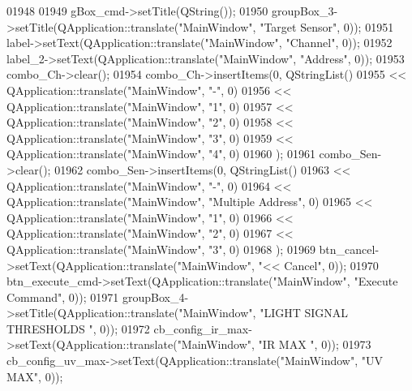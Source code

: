 \begin{DoxyCode}
01948 
01949         gBox\_cmd->setTitle(QString());
01950         groupBox\_3->setTitle(QApplication::translate(\textcolor{stringliteral}{"MainWindow"}, \textcolor{stringliteral}{"Target Sensor"}, 0));
01951         label->setText(QApplication::translate(\textcolor{stringliteral}{"MainWindow"}, \textcolor{stringliteral}{"Channel"}, 0));
01952         label\_2->setText(QApplication::translate(\textcolor{stringliteral}{"MainWindow"}, \textcolor{stringliteral}{"Address"}, 0));
01953         combo\_Ch->clear();
01954         combo\_Ch->insertItems(0, QStringList()
01955          << QApplication::translate(\textcolor{stringliteral}{"MainWindow"}, \textcolor{stringliteral}{"-"}, 0)
01956          << QApplication::translate(\textcolor{stringliteral}{"MainWindow"}, \textcolor{stringliteral}{"1"}, 0)
01957          << QApplication::translate(\textcolor{stringliteral}{"MainWindow"}, \textcolor{stringliteral}{"2"}, 0)
01958          << QApplication::translate(\textcolor{stringliteral}{"MainWindow"}, \textcolor{stringliteral}{"3"}, 0)
01959          << QApplication::translate(\textcolor{stringliteral}{"MainWindow"}, \textcolor{stringliteral}{"4"}, 0)
01960         );
01961         combo\_Sen->clear();
01962         combo\_Sen->insertItems(0, QStringList()
01963          << QApplication::translate(\textcolor{stringliteral}{"MainWindow"}, \textcolor{stringliteral}{"-"}, 0)
01964          << QApplication::translate(\textcolor{stringliteral}{"MainWindow"}, \textcolor{stringliteral}{"Multiple Address"}, 0)
01965          << QApplication::translate(\textcolor{stringliteral}{"MainWindow"}, \textcolor{stringliteral}{"1"}, 0)
01966          << QApplication::translate(\textcolor{stringliteral}{"MainWindow"}, \textcolor{stringliteral}{"2"}, 0)
01967          << QApplication::translate(\textcolor{stringliteral}{"MainWindow"}, \textcolor{stringliteral}{"3"}, 0)
01968         );
01969         btn\_cancel->setText(QApplication::translate(\textcolor{stringliteral}{"MainWindow"}, \textcolor{stringliteral}{"<< Cancel"}, 0));
01970         btn\_execute\_cmd->setText(QApplication::translate(\textcolor{stringliteral}{"MainWindow"}, \textcolor{stringliteral}{"Execute Command"}, 0));
01971         groupBox\_4->setTitle(QApplication::translate(\textcolor{stringliteral}{"MainWindow"}, \textcolor{stringliteral}{"LIGHT SIGNAL THRESHOLDS "}, 0));
01972         cb\_config\_ir\_max->setText(QApplication::translate(\textcolor{stringliteral}{"MainWindow"}, \textcolor{stringliteral}{"IR MAX "}, 0));
01973         cb\_config\_uv\_max->setText(QApplication::translate(\textcolor{stringliteral}{"MainWindow"}, \textcolor{stringliteral}{"UV MAX"}, 0));

\end{DoxyCode}
